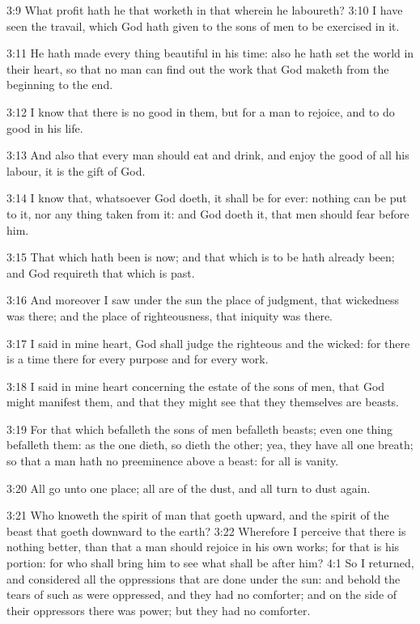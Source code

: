 3:9 What profit hath he that worketh in that wherein he laboureth?  3:10 I have seen the travail, which God hath given to the sons of men to be exercised in it.

3:11 He hath made every thing beautiful in his time: also he hath set the world in their heart, so that no man can find out the work that God maketh from the beginning to the end.

3:12 I know that there is no good in them, but for a man to rejoice, and to do good in his life.

3:13 And also that every man should eat and drink, and enjoy the good of all his labour, it is the gift of God.

3:14 I know that, whatsoever God doeth, it shall be for ever: nothing can be put to it, nor any thing taken from it: and God doeth it, that men should fear before him.

3:15 That which hath been is now; and that which is to be hath already been; and God requireth that which is past.

3:16 And moreover I saw under the sun the place of judgment, that wickedness was there; and the place of righteousness, that iniquity was there.

3:17 I said in mine heart, God shall judge the righteous and the wicked: for there is a time there for every purpose and for every work.

3:18 I said in mine heart concerning the estate of the sons of men, that God might manifest them, and that they might see that they themselves are beasts.

3:19 For that which befalleth the sons of men befalleth beasts; even one thing befalleth them: as the one dieth, so dieth the other; yea, they have all one breath; so that a man hath no preeminence above a beast: for all is vanity.

3:20 All go unto one place; all are of the dust, and all turn to dust again.

3:21 Who knoweth the spirit of man that goeth upward, and the spirit of the beast that goeth downward to the earth?  3:22 Wherefore I perceive that there is nothing better, than that a man should rejoice in his own works; for that is his portion: for who shall bring him to see what shall be after him?  4:1 So I returned, and considered all the oppressions that are done under the sun: and behold the tears of such as were oppressed, and they had no comforter; and on the side of their oppressors there was power; but they had no comforter.

